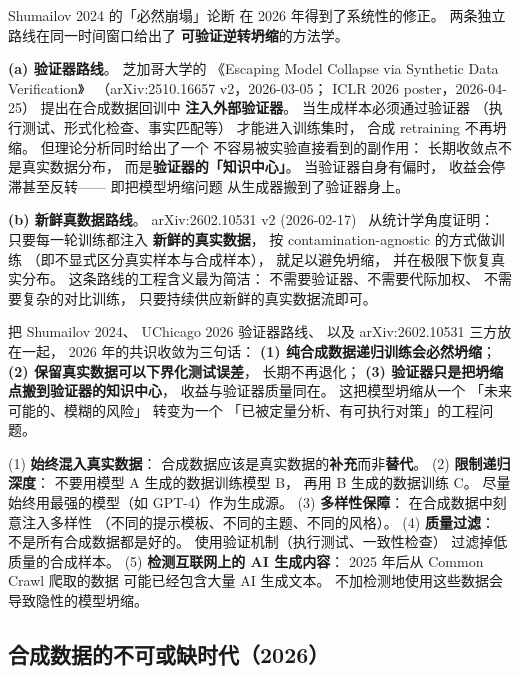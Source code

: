 Shumailov 2024 的「必然崩塌」论断
在 2026 年得到了系统性的修正。
两条独立路线在同一时间窗口给出了
\textbf{可验证逆转坍缩}的方法学。

\textbf{(a) 验证器路线}。
芝加哥大学的
《Escaping Model Collapse via Synthetic Data Verification》~\cite{uchicago2026verifier}
（arXiv:2510.16657 v2，2026-03-05；
ICLR 2026 poster，2026-04-25）
提出在合成数据回训中
\textbf{注入外部验证器}。
当生成样本必须通过验证器
（执行测试、形式化检查、事实匹配等）
才能进入训练集时，
合成 retraining 不再坍缩。
但理论分析同时给出了一个
不容易被实验直接看到的副作用：
长期收敛点不是真实数据分布，
而是\textbf{验证器的「知识中心」}。
当验证器自身有偏时，
收益会停滞甚至反转——
即把模型坍缩问题
从生成器搬到了验证器身上。

\textbf{(b) 新鲜真数据路线}。
arXiv:2602.10531 v2 (2026-02-17)~\cite{kazdam2026collapse}
从统计学角度证明：
只要每一轮训练都注入
\textbf{新鲜的真实数据}，
按 contamination-agnostic 的方式做训练
（即不显式区分真实样本与合成样本），
就足以避免坍缩，
并在极限下恢复真实分布。
这条路线的工程含义最为简洁：
不需要验证器、不需要代际加权、
不需要复杂的对比训练，
只要持续供应新鲜的真实数据流即可。

把 Shumailov 2024、
UChicago 2026 验证器路线、
以及 arXiv:2602.10531 三方放在一起，
2026 年的共识收敛为三句话：
\textbf{(1) 纯合成数据递归训练会必然坍缩}；
\textbf{(2) 保留真实数据可以下界化测试误差}，
长期不再退化；
\textbf{(3) 验证器只是把坍缩点搬到验证器的知识中心}，
收益与验证器质量同在。
这把模型坍缩从一个
「未来可能的、模糊的风险」
转变为一个
「已被定量分析、有可执行对策」的工程问题。

\begin{warnbox}[避免模型坍缩的实践建议]
(1) \textbf{始终混入真实数据}：
合成数据应该是真实数据的\textbf{补充}而非\textbf{替代}。
(2) \textbf{限制递归深度}：
不要用模型 A 生成的数据训练模型 B，
再用 B 生成的数据训练 C。
尽量始终用最强的模型（如 GPT-4）作为生成源。
(3) \textbf{多样性保障}：
在合成数据中刻意注入多样性
（不同的提示模板、不同的主题、不同的风格）。
(4) \textbf{质量过滤}：
不是所有合成数据都是好的。
使用验证机制（执行测试、一致性检查）
过滤掉低质量的合成样本。
(5) \textbf{检测互联网上的 AI 生成内容}：
2025 年后从 Common Crawl 爬取的数据
可能已经包含大量 AI 生成文本。
不加检测地使用这些数据会导致隐性的模型坍缩。
\end{warnbox}

\subsection{合成数据的不可或缺时代（2026）}


